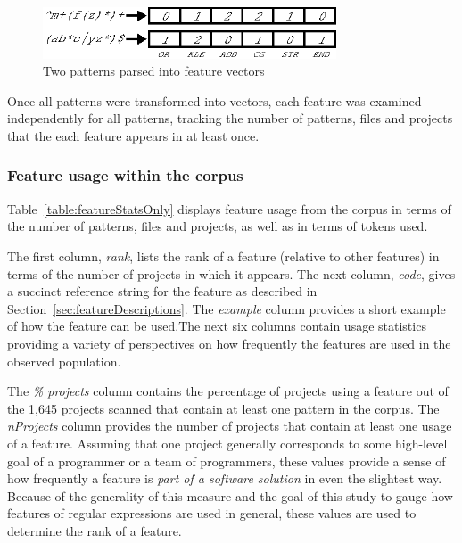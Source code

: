 \begin{figure}[tb]
\centering
\includegraphics[height=0.6in]{nontex/illustrations/featureParsing.eps}
\caption{Two patterns parsed into feature vectors}
\label{fig:featureParsing}
\vspace{-12pt}
\end{figure}

Once all patterns were transformed into vectors, each feature was examined independently for all patterns, tracking the number of patterns, files and projects that the each feature appears in at least once.



\subsubsection{Feature usage within the corpus}
\label{sec:featureResults}
Table~\ref{table:featureStatsOnly} displays feature usage from the corpus in terms of the number of patterns, files and projects, as well as in terms of tokens used.

The first column, \emph{rank}, lists the rank of a feature (relative to other features) in terms of the number of projects in which it appears. The next column, \emph{code}, gives a succinct reference string for the feature as described in Section~\ref{sec:featureDescriptions}. The \emph{example} column provides a short example of how the feature can be used.The next six columns contain usage statistics providing a variety of perspectives on how frequently the features are used in the observed population.

The \emph{\% projects} column contains the percentage of projects  using a feature out of the 1,645 projects scanned that contain at least one pattern in the corpus.  The \emph{nProjects} column provides the number of projects that contain at least one usage of a feature.  Assuming that one project generally corresponds to some high-level goal of a programmer or a team of programmers, these values provide a sense of how frequently a feature is \emph{part of a software solution} in even the slightest way.  Because of the generality of this measure and the goal of this study to gauge how features of regular expressions are used in general, these values are used to determine the rank of a feature.


